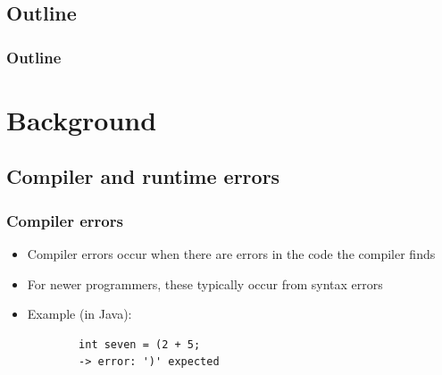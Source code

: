 \documentclass{beamer}
\begin{document}


\subsection*{Outline}

\begin{frame}
  \frametitle{Outline}
  \tableofcontents
\end{frame}

\section[Background]{Background}

\subsection{Compiler and runtime errors}

\begin{frame}[fragile]
	\frametitle{Compiler errors}
		\begin{itemize}
			\item Compiler errors occur when there are errors in the code the compiler finds
			\item For newer programmers, these typically occur from syntax errors
			\item Example (in Java):
			\begin{verbatim}
		int seven = (2 + 5;
		-> error: ')' expected
			\end{verbatim}
		\end{itemize}
\end{frame}
\end{document}
